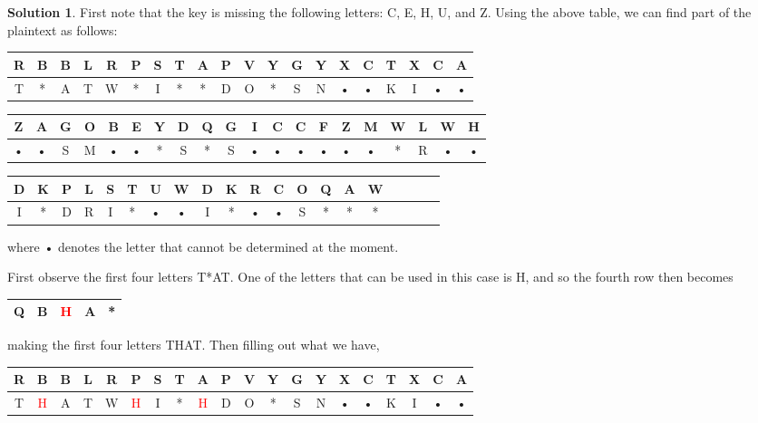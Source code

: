 \documentclass[11pt]{article}
\theoremstyle{definition}\newtheorem{definition}{Definition}
\theoremstyle{definition}\newtheorem{question}{Question}
\theoremstyle{definition}\newtheorem*{solution}{Solution}
\begin{document}
\begin{solution}
    First note that the key is missing the following letters: C, E, H, U, and Z. Using the above table, we can find part of the plaintext as follows:
    \begin{center}
        \begin{tabular}{|cc|cc|cc|cc|cc|cc|cc|cc|cc|cc|} \hline
            R & B & B & L & R & P & S & T & A & P & V & Y & G & Y & X & C & T & X & C & A \\ \hline
            T & * & A & T & W & * & I & * & * & D & O & * & S & N & • & • & K & I & • & • \\ \hline
        \end{tabular}

        \begin{tabular}{|cc|cc|cc|cc|cc|cc|cc|cc|cc|cc|} \hline
            Z & A & G & O & B & E & Y & D & Q & G & I & C & C & F & Z & M & W & L & W & H \\ \hline
            • & • & S & M & • & • & * & S & * & S & • & • & • & • & • & • & * & R & • & • \\ \hline
        \end{tabular}

        \begin{tabular}{|cc|cc|cc|cc|cc|cc|cc|cc|cc|cc|} \hline
            D & K & P & L & S & T & U & W & D & K & R & C & O & Q & A & W \\ \hline
            I & * & D & R & I & * & • & • & I & * & • & • & S & * & * & * \\ \hline
        \end{tabular}
    \end{center}
    where • denotes the letter that cannot be determined at the moment.

    First observe the first four letters T*AT. One of the letters that can be used in this case is H, and so the fourth row then becomes
    \begin{center}
        \begin{tabular}{|c|c|c|c|c|} \hline
            Q & B & \textcolor{red}{H} & A & * \\ \hline
        \end{tabular}
    \end{center}
    making the first four letters THAT. Then filling out what we have,
    \begin{center}
        \begin{tabular}{|cc|cc|cc|cc|cc|cc|cc|cc|cc|cc|} \hline
            R & B & B & L & R & P & S & T & A & P & V & Y & G & Y & X & C & T & X & C & A \\ \hline
            T & \textcolor{red}{H} & A & T & W & \textcolor{red}{H} & I & * & \textcolor{red}{H} & D & O & * & S & N & • & • & K & I & • & • \\ \hline
        \end{tabular}


\end{center}
\end{solution}
\end{document}
